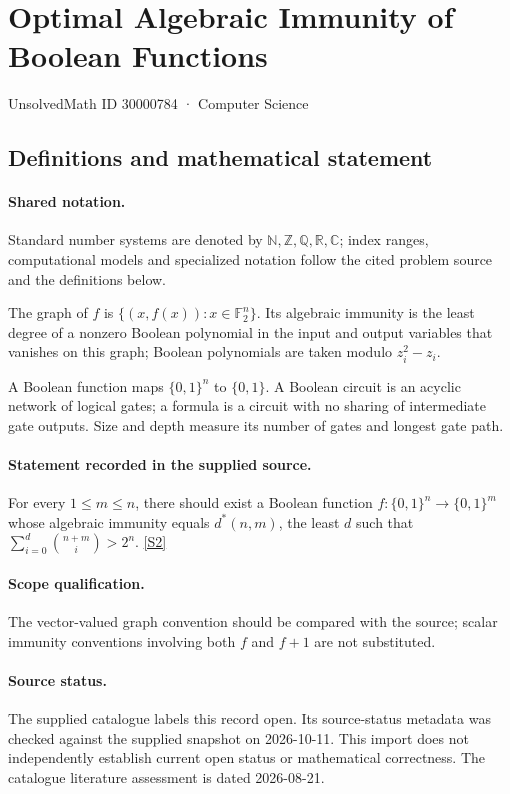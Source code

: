\documentclass[11pt]{article}
\newcommand{\sref}[2]{\hyperlink{source:#1:#2}{[S#2]}}
\begin{document}
\setcounter{section}{30000783}
\section{Optimal Algebraic Immunity of Boolean Functions}\label{30000784}
{\small\sffamily UnsolvedMath ID 30000784 · Computer Science}
\subsection{Definitions and mathematical statement}

\paragraph{Shared notation.}Standard number systems are denoted by $\mathbb N,\mathbb Z,\mathbb Q,\mathbb R,\mathbb C$; index ranges, computational models and specialized notation follow the cited problem source and the definitions below.


The graph of $f$ is $\{(x,f(x)):x\in\mathbb F_2^n\}$. Its algebraic immunity is the least degree of a nonzero Boolean polynomial in the input and output variables that vanishes on this graph; Boolean polynomials are taken modulo $z_i^2-z_i$.

A Boolean function maps $\{0,1\}^n$ to $\{0,1\}$. A Boolean circuit is an acyclic network of logical gates; a formula is a circuit with no sharing of intermediate gate outputs. Size and depth measure its number of gates and longest gate path.
\paragraph{Statement recorded in the supplied source.}
For every $1\leq m\leq n$, there should exist a Boolean function $f:\{0,1\}^n\to\{0,1\}^m$ whose algebraic immunity equals $d^*(n,m)$, the least $d$ such that $\sum_{i=0}^d\binom{n+m}{i}>2^n$. \sref{30000784}{2}
\paragraph{Scope qualification.}
The vector-valued graph convention should be compared with the source; scalar immunity conventions involving both $f$ and $f+1$ are not substituted.
\paragraph{Source status.}
The supplied catalogue labels this record open. Its source-status metadata was checked against the supplied snapshot on 2026-10-11. This import does not independently establish current open status or mathematical correctness. The catalogue literature assessment is dated 2026-08-21.
\end{document}
